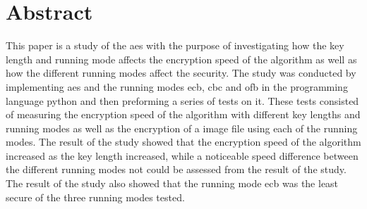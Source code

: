 \documentclass[a4paper, 12pt]{report}
\newcommand{\fakechapter}[2]{%
  \par\setcounter{chapter}{#2}
  \chaptermark{#1}
  \rhead{ }
}
\begin{document}
\chapter*{Abstract}
This paper is a study of the \acrlong{aes} with the purpose of investigating how the key length and running mode affects the encryption speed of the algorithm
as well as how the different running modes affect the security. The study was conducted by implementing \acrshort{aes} and the running modes \acrshort{ecb}, \acrshort{cbc} and \acrshort{ofb} in the programming language \gls{python} and
then preforming a series of tests on it. These tests consisted of measuring the encryption speed of the algorithm with different key lengths and running modes as well as the encryption
of a image file using each of the running modes. The result of the study showed that the encryption speed of the algorithm increased as the key length increased, while a noticeable speed difference
between the different running modes not could be assessed from the result of the study. The result of the study also showed that the running mode \acrshort{ecb} was the least secure of the three
running modes tested.


\tableofcontents

\listoffigures

\clearpage

\printglossary

\printglossary[type=\acronymtype, style=super]













\fakechapter{Källförteckning}{7}
\printbibliography[title=Källförteckning]

\clearpage



\end{document}
